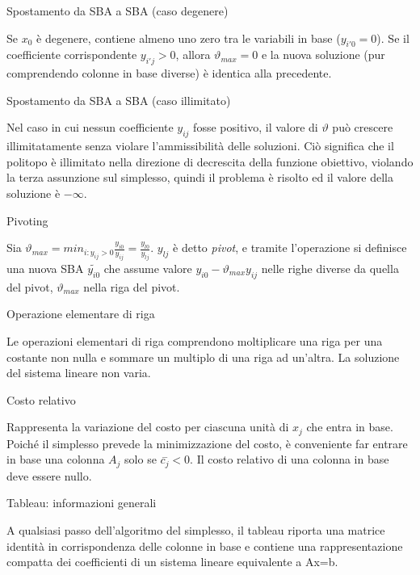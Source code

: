 \documentclass[answers, a4paper, 11pt]{exam}
\begin{document}
\begin{questions}
\begin{solution}
\end{solution}
\question Spostamento da SBA a SBA (caso degenere)
\begin{solution}
Se $x_{0}$ è degenere, contiene almeno uno zero tra le variabili in base ($y_{i'0}=0$). Se il coefficiente corrispondente $y_{i'j}>0$, allora $\vartheta_{max}=0$ e la nuova soluzione (pur comprendendo colonne in base diverse) è identica alla precedente. 
\end{solution}
\question Spostamento da SBA a SBA (caso illimitato)
\begin{solution}
Nel caso in cui nessun coefficiente $y_{ij}$ fosse positivo, il valore di $\vartheta$ può crescere illimitatamente senza violare l'ammissibilità delle soluzioni. Ciò significa che il politopo è illimitato nella direzione di decrescita della funzione obiettivo, violando la terza assunzione sul simplesso, quindi il problema è risolto ed il valore della soluzione è $-\infty$.
\end{solution}
\question Pivoting
\begin{solution}
Sia $\vartheta_{max} = min_{i:y_{ij}>0} \frac{y_{i0}}{y_{ij}} = \frac{y_{l0}}{y_{lj}}$. $y_{lj}$ è detto \emph{pivot}, e tramite l'operazione si definisce una nuova SBA ${\tilde{y_{i0}}}$ che assume valore $y_{i0} - \vartheta_{max}y_{ij}$ nelle righe diverse da quella del pivot, $\vartheta_{max}$ nella riga del pivot.
\end{solution}
\question Operazione elementare di riga
\begin{solution}
Le operazioni elementari di riga comprendono moltiplicare una riga per una costante non nulla e sommare un multiplo di una riga ad un'altra. La soluzione del sistema lineare non varia.
\end{solution}
\question Costo relativo
\begin{solution}
Rappresenta la variazione del costo per ciascuna unità di $x_{j}$ che entra in base. Poiché il simplesso prevede la minimizzazione del costo, è conveniente far entrare in base una colonna $A_{j}$ solo se $\stackrel{-}{c_{j}}<0$. Il costo relativo di una colonna in base deve essere nullo.
\end{solution}
\question Tableau: informazioni generali 
\begin{solution}
A qualsiasi passo dell'algoritmo del simplesso, il tableau riporta una matrice identità in corrispondenza delle colonne in base e contiene una rappresentazione compatta dei coefficienti di un sistema lineare equivalente a Ax=b.  
\end{solution}

\end{questions}
\end{document}

